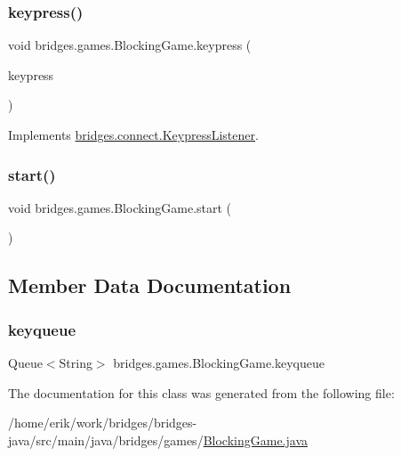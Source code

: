 \subsubsection{\texorpdfstring{keypress()}{keypress()}}
{\footnotesize\ttfamily void bridges.\+games.\+Blocking\+Game.\+keypress (\begin{DoxyParamCaption}\item[{J\+S\+O\+N\+Object}]{keypress }\end{DoxyParamCaption})}



Implements \hyperlink{interfacebridges_1_1connect_1_1_keypress_listener_af713d94f36bce842f39ce0aea4db8da6}{bridges.\+connect.\+Keypress\+Listener}.

\mbox{\label{classbridges_1_1games_1_1_blocking_game_a00f9ad93393ba18407940f24aaddfa21}} 
\subsubsection{\texorpdfstring{start()}{start()}}
{\footnotesize\ttfamily void bridges.\+games.\+Blocking\+Game.\+start (\begin{DoxyParamCaption}{ }\end{DoxyParamCaption})}



\subsection{Member Data Documentation}
\mbox{\label{classbridges_1_1games_1_1_blocking_game_a7a8057fd0e008879f89c86d929cc92e6}} 
\subsubsection{\texorpdfstring{keyqueue}{keyqueue}}
{\footnotesize\ttfamily Queue$<$String$>$ bridges.\+games.\+Blocking\+Game.\+keyqueue\hspace{0.3cm}{\ttfamily [protected]}}



The documentation for this class was generated from the following file\+:\begin{DoxyCompactItemize}
\item 
/home/erik/work/bridges/bridges-\/java/src/main/java/bridges/games/\hyperlink{_blocking_game_8java}{Blocking\+Game.\+java}\end{DoxyCompactItemize}
